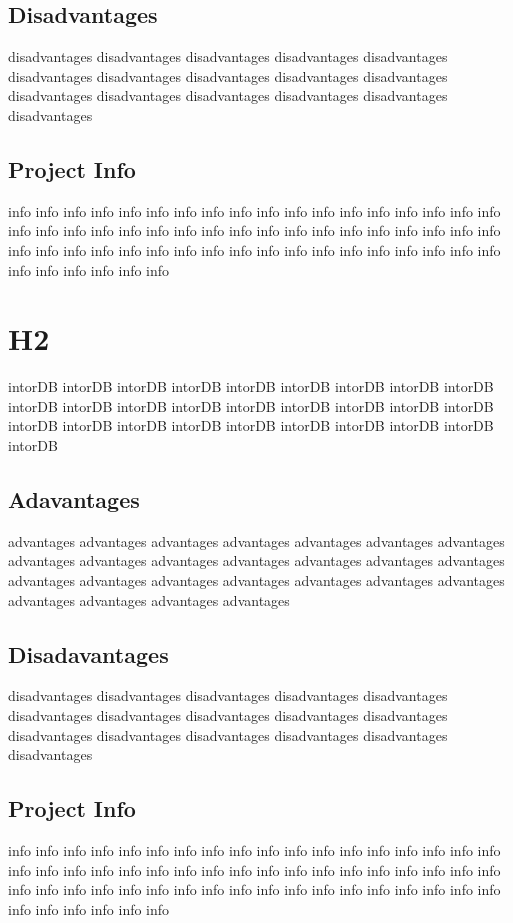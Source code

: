 			\subsection{Disadvantages}
			disadvantages disadvantages disadvantages disadvantages 
			disadvantages disadvantages disadvantages disadvantages 
			disadvantages disadvantages disadvantages disadvantages 
			disadvantages disadvantages disadvantages disadvantages 
			
			\subsection{Project Info}
			info info info info info info info info info info info info 
			info info info info info info info info info info info info 
			info info info info info info info info info info info info 
			info info info info info info info info info info info info 
			info info info info info info info info info info info info
		
		\section{H2}
		intorDB intorDB intorDB intorDB intorDB intorDB intorDB 
		intorDB intorDB intorDB intorDB intorDB intorDB intorDB 
		intorDB intorDB intorDB intorDB intorDB intorDB intorDB 
		intorDB intorDB intorDB intorDB intorDB intorDB intorDB 
		
			\subsection{Adavantages}
			advantages advantages advantages advantages advantages 
			advantages advantages advantages advantages advantages 
			advantages advantages advantages advantages advantages 
			advantages advantages advantages advantages advantages 
			advantages advantages advantages advantages advantages 
			
			\subsection{Disadavantages}
			disadvantages disadvantages disadvantages disadvantages 
			disadvantages disadvantages disadvantages disadvantages 
			disadvantages disadvantages disadvantages disadvantages 
			disadvantages disadvantages disadvantages disadvantages 
			
			\subsection{Project Info}
			info info info info info info info info info info info info 
			info info info info info info info info info info info info 
			info info info info info info info info info info info info 
			info info info info info info info info info info info info 
			info info info info info info info info info info info info
		
